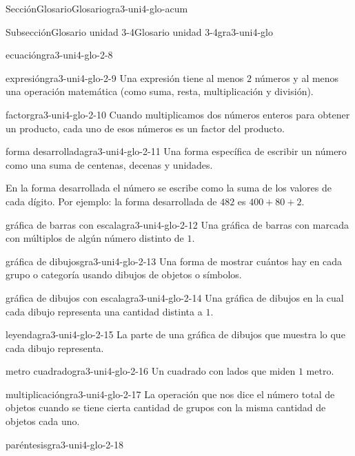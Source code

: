 \documentclass[twoside,14pt,]{extarticle}
\begin{document}
\begin{sectionptx}{Sección}{Glosario}{}{Glosario}{}{}{gra3-uni4-glo-acum}
\begin{subsectionptx}{Subsección}{Glosario unidad 3-4}{}{Glosario unidad 3-4}{}{}{gra3-uni4-glo}
\begin{descriptionlist}
\begin{dlimedium}{ecuación}{gra3-uni4-glo-2-8}
\end{dlimedium}%
\begin{dlimedium}{expresión}{gra3-uni4-glo-2-9}%
Una expresión tiene al menos \(2\) números y al menos una operación matemática (como suma, resta, multiplicación y división).%
\end{dlimedium}%
\begin{dlimedium}{factor}{gra3-uni4-glo-2-10}%
Cuando multiplicamos dos números enteros para obtener un producto, cada uno de esos números es un factor del producto.%
\end{dlimedium}%
\begin{dlimedium}{forma desarrollada}{gra3-uni4-glo-2-11}%
Una forma específica de escribir un número como una suma de centenas, decenas y unidades.%
\par
En la forma desarrollada el número se escribe como la suma de los valores de cada dígito. Por ejemplo: la forma desarrollada de \(482\) es \(400 + 80 + 2\).%
\end{dlimedium}%
\begin{dlimedium}{gráfica de barras con escala}{gra3-uni4-glo-2-12}%
Una gráfica de barras con marcada con múltiplos de algún número distinto de \(1\).%
\end{dlimedium}%
\begin{dlimedium}{gráfica de dibujos}{gra3-uni4-glo-2-13}%
Una forma de mostrar cuántos hay en cada grupo o categoría usando dibujos de objetos o símbolos.%
\end{dlimedium}%
\begin{dlimedium}{gráfica de dibujos con escala}{gra3-uni4-glo-2-14}%
Una gráfica de dibujos en la cual cada dibujo representa una cantidad distinta a \(1\).%
\end{dlimedium}%
\begin{dlimedium}{leyenda}{gra3-uni4-glo-2-15}%
La parte de una gráfica de dibujos que muestra lo que cada dibujo representa.%
\end{dlimedium}%
\begin{dlimedium}{metro cuadrado}{gra3-uni4-glo-2-16}%
Un cuadrado con lados que miden \(1\) metro.%
\end{dlimedium}%
\begin{dlimedium}{multiplicación}{gra3-uni4-glo-2-17}%
La operación que nos dice el número total de objetos cuando se tiene cierta cantidad de grupos con la misma cantidad de objetos cada uno.%
\end{dlimedium}%
\begin{dlimedium}{paréntesis}{gra3-uni4-glo-2-18}%

\end{dlimedium}
\end{descriptionlist}
\end{subsectionptx}
\end{sectionptx}
\end{document}
